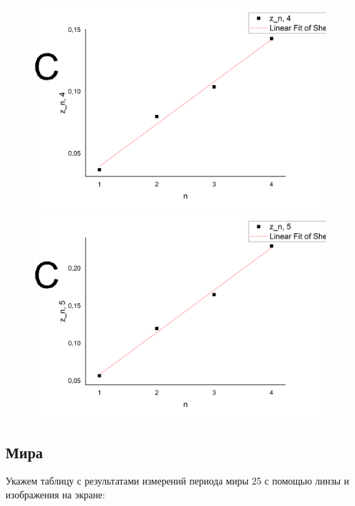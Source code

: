 \documentclass[a4paper,12pt]{article}
\begin{document}
\begin{figure}[ht!]
		\includegraphics[scale=0.2]{4.png}\hfill
		\includegraphics[scale=0.2]{5.png}
	\end{figure}
\subsection{Мира}

Укажем таблицу с результатами измерений периода миры 25 с помощью линзы и изображения на экране:
\end{document}

